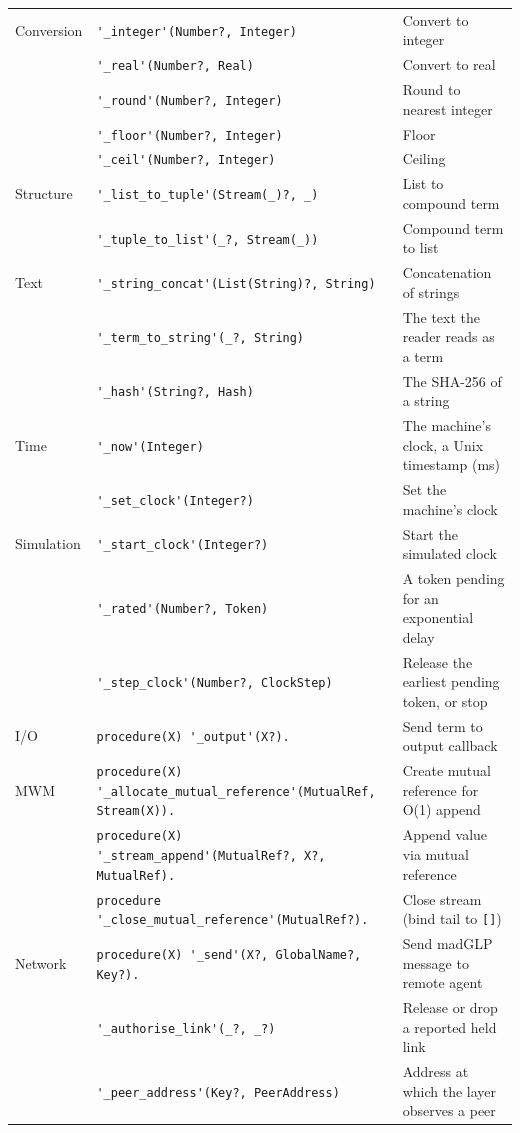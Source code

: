 \begin{center}
{\begin{tabular}{@{}l@{\hspace{4pt}}l@{\hspace{4pt}}p{}@{}}
\hline
Conversion & \verb|'_integer'(Number?, Integer)| & Convert to integer \\
 & \verb|'_real'(Number?, Real)| & Convert to real \\
 & \verb|'_round'(Number?, Integer)| & Round to nearest integer \\
 & \verb|'_floor'(Number?, Integer)| & Floor \\
 & \verb|'_ceil'(Number?, Integer)| & Ceiling \\
\hline
Structure & \verb|'_list_to_tuple'(Stream(_)?, _)| & List to compound term \\
 & \verb|'_tuple_to_list'(_?, Stream(_))| & Compound term to list \\
\hline
Text & \verb|'_string_concat'(List(String)?, String)| & Concatenation of strings \\
 & \verb|'_term_to_string'(_?, String)| & The text the reader reads as a term \\
 & \verb|'_hash'(String?, Hash)| & The SHA-256 of a string \\
\hline
Time & \verb|'_now'(Integer)| & The machine's clock, a Unix timestamp (ms) \\
 & \verb|'_set_clock'(Integer?)| & Set the machine's clock \\
\hline
Simulation & \verb|'_start_clock'(Integer?)| & Start the simulated clock \\
 & \verb|'_rated'(Number?, Token)| & A token pending for an exponential delay \\
 & \verb|'_step_clock'(Number?, ClockStep)| & Release the earliest pending token, or stop \\
\hline
I/O & \verb|procedure(X) '_output'(X?).| & Send term to output callback \\
\hline
MWM & \verb|procedure(X) '_allocate_mutual_reference'(MutualRef, Stream(X)).| & Create mutual reference for O(1) append \\
 & \verb|procedure(X) '_stream_append'(MutualRef?, X?, MutualRef).| & Append value via mutual reference \\
 & \verb|procedure '_close_mutual_reference'(MutualRef?).| & Close stream (bind tail to \verb|[]|) \\
\hline
Network & \verb|procedure(X) '_send'(X?, GlobalName?, Key?).| & Send madGLP message to remote agent \\
 & \verb|'_authorise_link'(_?, _?)| & Release or drop a reported held link \\
 & \verb|'_peer_address'(Key?, PeerAddress)| & Address at which the layer observes a peer \\

\end{tabular}}
\end{center}
